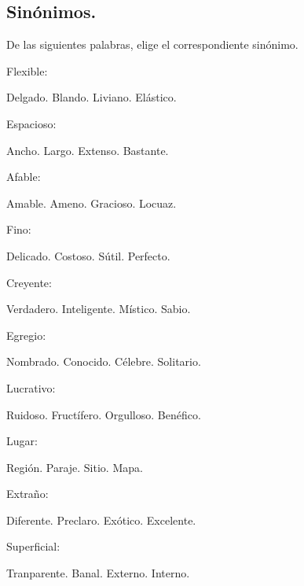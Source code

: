 \documentclass[12pt]{exam}
\begin{document}
\begin{multicols}{2}
\begin{questions}
\subsection{Sinónimos.}

De las siguientes palabras, elige el correspondiente sinónimo.

    \question Flexible:
    \begin{choices}
        \choice Delgado.
        \choice Blando.
        \choice Liviano.
        \choice Elástico.
    \end{choices}
    \question Espacioso:
    \begin{choices}
        \choice Ancho.
        \choice Largo.
        \choice Extenso.
        \choice Bastante.
    \end{choices}
    \question Afable:
    \begin{choices}
        \choice Amable.
        \choice Ameno.
        \choice Gracioso.
        \choice Locuaz.
    \end{choices}
    \question Fino:
    \begin{choices}
        \choice Delicado.
        \choice Costoso.
        \choice Sútil.
        \choice Perfecto.
    \end{choices}
   \question Creyente:
    \begin{choices}
        \choice Verdadero.
        \choice Inteligente.
        \choice Místico.
        \choice Sabio.
    \end{choices}
    \question Egregio:
    \begin{choices}
        \choice Nombrado.
        \choice Conocido.
        \choice Célebre.
        \choice Solitario.
    \end{choices}
    \question Lucrativo:
    \begin{choices}
        \choice Ruidoso.
        \choice Fructífero.
        \choice Orgulloso.
        \choice Benéfico.
    \end{choices}
    \question Lugar:
    \begin{choices}
        \choice Región.
        \choice Paraje.
        \choice Sitio.
        \choice Mapa.
    \end{choices}
    \question Extraño:
    \begin{choices}
        \choice Diferente.
        \choice Preclaro.
        \choice Exótico.
        \choice Excelente.
    \end{choices}
    \question Superficial:
    \begin{choices}
        \choice Tranparente.
        \choice Banal.
        \choice Externo.
        \choice Interno.
    \end{choices}
\end{questions}
\end{multicols}
\end{document}
